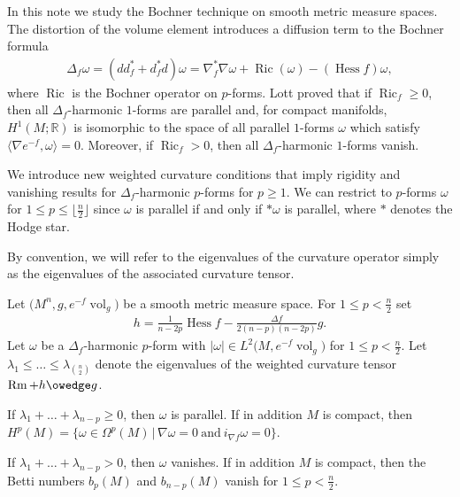 \documentclass[pdftex]{sigma}
\numberwithin{equation}{section}
\newcommand{\vol}{\operatorname{vol}}
\newcommand{\Ric} {\operatorname{Ric}}
\newcommand{\Hess} {\operatorname{Hess}}
\newcommand{\R}{\mathbb{R}}
\newcommand{\Rm} {\operatorname{Rm}}
\begin{document}
In this note we study the Bochner technique on smooth metric measure spaces. The distortion of the volume element introduces a diffusion term to the Bochner formula
\begin{gather*}
\Delta_f \omega = ( d d^{*}_f + d^{*}_f d) \omega= \nabla^{*}_f \nabla \omega + \Ric(\omega) - ( \Hess f ) \omega,
\end{gather*}
where $\Ric$ is the Bochner operator on $p$-forms. Lott \cite{LottGeometryBETensor} proved that if $\Ric_f \geq 0$, then all $\Delta_f$-harmonic $1$-forms are parallel and, for compact manifolds, $H^1(M;\R)$ is isomorphic to the space of all parallel $1$-forms $\omega$ which satisfy $\big\langle \nabla e^{-f}, \omega \big\rangle = 0$. Moreover, if $\Ric_f > 0$, then all $\Delta_f$-harmonic $1$-forms vanish.

We introduce new weighted curvature conditions that imply rigidity and vanishing results for $\Delta_f$-harmonic $p$-forms for $p \geq 1$. We can restrict to $p$-forms $\omega$ for $1 \leq p \leq \big\lfloor \frac{n}{2}\big\rfloor$ since $\omega$ is parallel if and only if $\ast \omega$ is parallel, where $\ast$ denotes the Hodge star.

By convention, we will refer to the eigenvalues of the curvature operator simply as the eigenvalues of the associated curvature tensor.

\begin{theorem*}
Let $\big(M^n,g, e^{-f} \vol_g\big)$ be a smooth metric measure space. For $1 \leq p < \frac{n}{2}$ set
\begin{gather*}
h = \frac{1}{n-2p} \Hess f - \frac{\Delta f}{2(n-p)(n-2p)} g.
\end{gather*}
Let $\omega$ be a $\Delta_f$-harmonic $p$-form with $|\omega| \in L^2\big(M, e^{-f} \vol_g\big)$ for $1 \leq p < \frac{n}{2}$. Let $\lambda_1 \leq \dots \leq \lambda_{\genfrac(){0pt}{2}{n}{2}}$ denote the eigenvalues of the weighted curvature tensor $\Rm + h \owedge g$.

If $\lambda_1 + \dots + \lambda_{n-p} \geq 0$, then $\omega$ is parallel. If in addition $M$ is compact, then $H^{p}(M)= \big\lbrace \omega \in \Omega^p(M) \, \vert \, \nabla \omega =0 \ \text{and} \ i_{\nabla f} \omega = 0 \big\rbrace$.

If $\lambda_1 + \dots + \lambda_{n-p} > 0$, then $\omega$ vanishes. If in addition $M$ is compact, then the Betti numbers $b_p(M)$ and $b_{n-p}(M)$ vanish for $1 \leq p < \frac{n}{2}$.
\end{theorem*}
\end{document}
